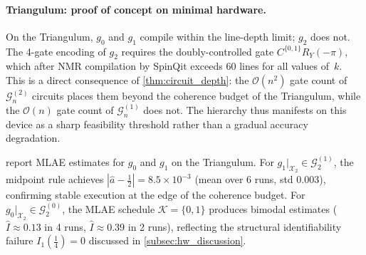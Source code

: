 \documentclass[12pt,a4paper]{article}
\theoremstyle{plain}
\theoremstyle{definition}
\theoremstyle{remark}
\newcommand{\Gclass}[2]{\mathcal{G}_{#1}^{(#2)}}
\begin{document}
\paragraph{Triangulum: proof of concept on minimal hardware.}
On the Triangulum, $g_0$ and $g_1$ compile within the
line-depth limit; $g_2$ does not.
The 4-gate encoding of $g_2$ requires the doubly-controlled
gate $C^{\{0,1\}}R_Y(-\pi)$, which after NMR compilation by
SpinQit \cite{SpinQit2022} exceeds 60 lines for all values of~$k$.
This is a direct consequence of \cref{thm:circuit_depth}: the
$\mathcal{O}(n^2)$ gate count of $\Gclass{n}{2}$ circuits places
them beyond the coherence budget of the Triangulum, while the
$\mathcal{O}(n)$ gate count of $\Gclass{n}{1}$ does not.
The hierarchy thus manifests on this device as a sharp feasibility
threshold rather than a gradual accuracy degradation.

 report MLAE estimates
for $g_0$ and $g_1$ on the Triangulum.
For $g_1|_{\mathcal{X}_2}\in\Gclass{2}{1}$, the midpoint rule achieves
$|\hat{a}-\tfrac{1}{2}|=8.5\times10^{-3}$ (mean over 6 runs,
std $0.003$), confirming stable execution at the edge of the
coherence budget.
For $g_0|_{\mathcal{X}_2}\in\Gclass{2}{0}$, the MLAE schedule $\mathcal{K}=\{0,1\}$
produces bimodal estimates ($\hat{I}\approx0.13$ in 4 runs,
$\hat{I}\approx0.39$ in 2 runs), reflecting the structural
identifiability failure $I_1(\tfrac{1}{4})=0$ discussed in
\cref{subsec:hw_discussion}.
\end{document}
